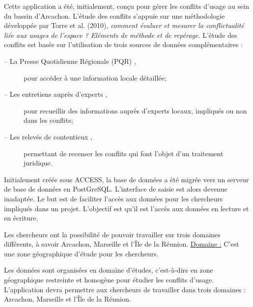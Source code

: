 \documentclass[12pt,a4paper]{article}
\begin{document}
Cette application a été, initialement, conçu pour gérer les conflits d'usage au sein du bassin d'Arcachon. L’étude des conflits s’appuie sur une méthodologie développée par Torre et al. (2010), \emph{comment évaluer et mesurer la conflictualité liée aux usages de l'espace ? Eléments de méthode et de repérage.} \newline \newline
L'étude des conflits est basée sur l’utilisation de trois sources de données complémentaires :
\begin{description}
\item[–	La Presse Quotidienne Régionale  (PQR) ,] pour accéder à une information locale détaillée;
\item[–	Les entretiens auprès d’experts ,] pour recueillir des informations auprès d’experts locaux, impliqués ou non dans les conflits; 
\item[–	Les relevés de contentieux ,] permettant de recenser les conflits qui font l’objet d’un  traitement juridique. \newline
\end{description}


Initialement créée sous ACCESS, la base de données a été migrée vers un serveur de base de données en PostGreSQL. L’interface de saisie est alors devenue inadaptée. Le but est de faciliter l’accès aux données pour les chercheurs impliqués dans un projet. L'objectif est qu'il est l'accès aux données en lecture et en écriture. \newline \newline

Les chercheurs ont la possibilité de pouvoir travailler sur trois domaines différents, à savoir Arcachon, Marseille et l'Île de la Réunion.\newline
\underline{Domaine :} C'est une zone géographique d'étude pour les chercheurs.

Les données sont organisées en domaine d'études, c'est-à-dire en zone géographique restreinte et homogène pour étudier les conflits d'usage. L'application devra permettre aux chercheurs de travailler dans trois domaines : Arcachon, Marseille et l'Île de la Réunion.
\end{document}
